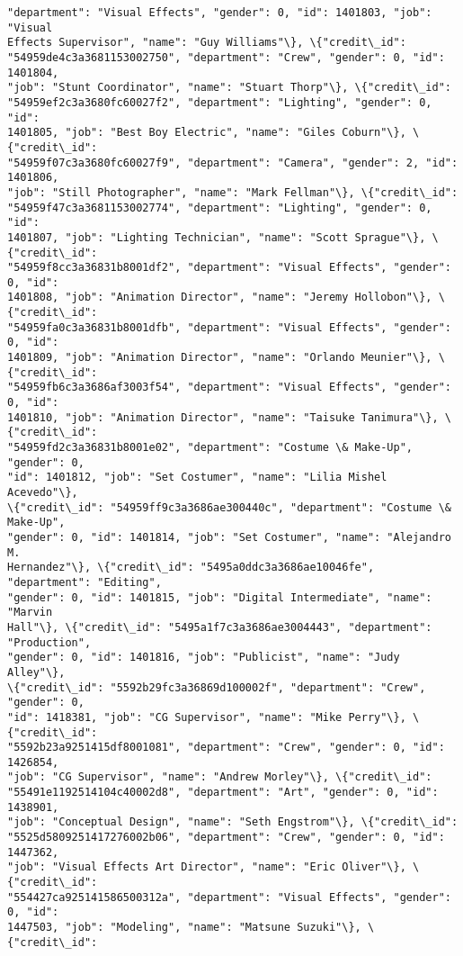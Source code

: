 \documentclass[11pt]{article}
\begin{document}
\begin{tcolorbox}[breakable, size=fbox, boxrule=.5pt, pad at break*=1mm, opacityfill=0]
\begin{Verbatim}[commandchars=\\\{\}]
"department": "Visual Effects", "gender": 0, "id": 1401803, "job": "Visual
Effects Supervisor", "name": "Guy Williams"\}, \{"credit\_id":
"54959de4c3a3681153002750", "department": "Crew", "gender": 0, "id": 1401804,
"job": "Stunt Coordinator", "name": "Stuart Thorp"\}, \{"credit\_id":
"54959ef2c3a3680fc60027f2", "department": "Lighting", "gender": 0, "id":
1401805, "job": "Best Boy Electric", "name": "Giles Coburn"\}, \{"credit\_id":
"54959f07c3a3680fc60027f9", "department": "Camera", "gender": 2, "id": 1401806,
"job": "Still Photographer", "name": "Mark Fellman"\}, \{"credit\_id":
"54959f47c3a3681153002774", "department": "Lighting", "gender": 0, "id":
1401807, "job": "Lighting Technician", "name": "Scott Sprague"\}, \{"credit\_id":
"54959f8cc3a36831b8001df2", "department": "Visual Effects", "gender": 0, "id":
1401808, "job": "Animation Director", "name": "Jeremy Hollobon"\}, \{"credit\_id":
"54959fa0c3a36831b8001dfb", "department": "Visual Effects", "gender": 0, "id":
1401809, "job": "Animation Director", "name": "Orlando Meunier"\}, \{"credit\_id":
"54959fb6c3a3686af3003f54", "department": "Visual Effects", "gender": 0, "id":
1401810, "job": "Animation Director", "name": "Taisuke Tanimura"\}, \{"credit\_id":
"54959fd2c3a36831b8001e02", "department": "Costume \& Make-Up", "gender": 0,
"id": 1401812, "job": "Set Costumer", "name": "Lilia Mishel Acevedo"\},
\{"credit\_id": "54959ff9c3a3686ae300440c", "department": "Costume \& Make-Up",
"gender": 0, "id": 1401814, "job": "Set Costumer", "name": "Alejandro M.
Hernandez"\}, \{"credit\_id": "5495a0ddc3a3686ae10046fe", "department": "Editing",
"gender": 0, "id": 1401815, "job": "Digital Intermediate", "name": "Marvin
Hall"\}, \{"credit\_id": "5495a1f7c3a3686ae3004443", "department": "Production",
"gender": 0, "id": 1401816, "job": "Publicist", "name": "Judy Alley"\},
\{"credit\_id": "5592b29fc3a36869d100002f", "department": "Crew", "gender": 0,
"id": 1418381, "job": "CG Supervisor", "name": "Mike Perry"\}, \{"credit\_id":
"5592b23a9251415df8001081", "department": "Crew", "gender": 0, "id": 1426854,
"job": "CG Supervisor", "name": "Andrew Morley"\}, \{"credit\_id":
"55491e1192514104c40002d8", "department": "Art", "gender": 0, "id": 1438901,
"job": "Conceptual Design", "name": "Seth Engstrom"\}, \{"credit\_id":
"5525d5809251417276002b06", "department": "Crew", "gender": 0, "id": 1447362,
"job": "Visual Effects Art Director", "name": "Eric Oliver"\}, \{"credit\_id":
"554427ca925141586500312a", "department": "Visual Effects", "gender": 0, "id":
1447503, "job": "Modeling", "name": "Matsune Suzuki"\}, \{"credit\_id":

\end{Verbatim}
\end{tcolorbox}
\end{document}
